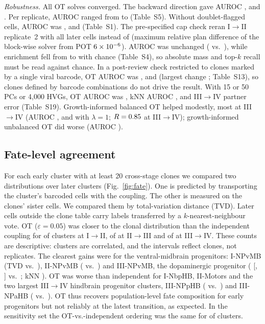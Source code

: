\documentclass[10pt,journal,compsoc]{IEEEtran}
\begin{document}
\emph{Robustness.} All \nOTSolves{} OT solves converged. The backward direction gave AUROC
\rqOneBwdAUROCOne, \rqOneBwdAUROCTwo{} and \rqOneBwdAUROCThree. Per replicate, AUROC
ranged from \rqOneRepAUROCMin{} to \rqOneRepAUROCMax{} (Table~S5). Without doublet-flagged
cells, AUROC was \rqOneSensAUROCOne, \rqOneSensAUROCTwo{} and \rqOneSensAUROCThree{}
(Table~S1). The pre-specified cap check reran I$\to$II replicate~2 with all
\capNLaterUncapped{} later cells instead of \capNLaterCapped{} (maximum relative plan
difference of the block-wise solver from POT $6\times10^{-6}$). AUROC was unchanged
(\capUncapAUROC{} vs.\ \capCapAUROC), while enrichment fell from \capCapEnr{} to
\capUncapEnr{} with chance (Table~S4), so absolute mass and top-$k$ recall must be read
against chance. In a post-review check restricted to
clones marked by a single viral barcode, OT AUROC was \sbAUROCOne, \sbAUROCTwo{} and
\sbAUROCThree{} (largest change \sbMaxAbsAUROCDiff; Table~S13), so clones defined by
barcode combinations do not drive the result. With 15 or 50 PCs or 4{,}000 HVGs, OT AUROC
was \genOTAUROC, kNN AUROC \genKnnAUROC, and III$\to$IV partner error \genOTRThree{}
(Table~S19). Growth-informed balanced OT helped modestly, most at III$\to$IV (AUROC
\grAUROCOneOne, \grAUROCOneTwo{} and \grAUROCOneThree{} with $\lambda=1$; $R=0.85$
at III$\to$IV); growth-informed unbalanced OT did worse (AUROC \grUnbAUROC).

\subsection{Fate-level agreement}\label{sec:fate}
For each early cluster with at least 20 cross-stage clones we compared two distributions
over later clusters (Fig.~\ref{fig:fate}). One is predicted by transporting the cluster's
barcoded cells with the coupling. The other is measured on the clones' sister cells. We
compared them by total-variation distance (TVD). Later cells outside the clone table carry
labels transferred by a $k$-nearest-neighbour vote. OT ($\varepsilon=0.05$) was closer to
the clonal distribution than the independent coupling for \fateNBetterOne{} of
\fateNClustersOne{} clusters at I$\to$II, \fateNBetterTwo{} of \fateNClustersTwo{} at
II$\to$III and \fateNBetterThree{} of \fateNClustersThree{} at III$\to$IV. These counts are
descriptive: clusters are correlated, and the intervals reflect clones, not replicates. The
clearest gains were for the ventral-midbrain progenitors: I-NPvMB (TVD \tvdOTOneNPvMB{}
vs.\ \tvdIndOneNPvMB), II-NPvMB (\tvdOTTwoNPvMB{} vs.\ \tvdIndTwoNPvMB) and III-NPvMB, the
dopaminergic progenitor (\tvdOTThreeNPvMB{} [\tvdOTLoThreeNPvMB, \tvdOTHiThreeNPvMB] vs.\
\tvdIndThreeNPvMB; kNN \tvdKnnThreeNPvMB). OT was worse than independent for I-NbpHB,
II-Motors and the two largest III$\to$IV hindbrain progenitor clusters, III-NPpHB
(\tvdOTThreeNPpHB{} vs.\ \tvdIndThreeNPpHB) and III-NPaHB (\tvdOTThreeNPaHB{} vs.\
\tvdIndThreeNPaHB). OT thus recovers population-level fate composition for early
progenitors but not reliably at the latest transition, as expected. In the sensitivity set
the OT-vs.-independent ordering was the same for \fateSensAgreeAll{} of \fateSensNAll{}
clusters.
\end{document}
